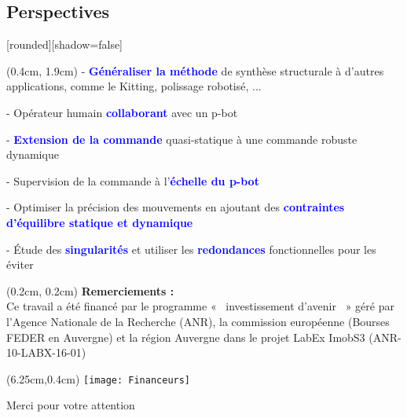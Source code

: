 \documentclass[french]{beamer}
\begin{document}
\subsection{Perspectives}
\begin{frame}
[rounded][shadow=false]
{\normalsize %
\begin{textblock*}{12cm}(0.4cm, 1.9cm)
\vspace{0.25cm}
- \textcolor{blue}{\textbf{Généraliser la méthode}} de synthèse structurale à d'autres applications, comme le Kitting, polissage robotisé, ...

\vspace{0.25cm}
- Opérateur humain \textcolor{blue}{\textbf{collaborant}} avec un p-bot

\vspace{0.25cm}
- \textcolor{blue}{\textbf{Extension de la commande}} quasi-statique à une commande robuste dynamique

\vspace{0.25cm}
- Supervision de la commande à l'\textcolor{blue}{\textbf{échelle du p-bot}}

\vspace{0.25cm}
- Optimiser la précision des mouvements en ajoutant des \textcolor{blue}{\textbf{contraintes d'équilibre statique et dynamique}}

\vspace{0.25cm}
- Étude des \textcolor{blue}{\textbf{singularités}} et utiliser les \textcolor{blue}{\textbf{redondances}} fonctionnelles pour les éviter
\end{textblock*}
}
\end{frame}

{
\begin{frame}
\begin{textblock*}{6cm}(0.2cm, 0.2cm)
\justifying
\tiny{\textbf{Remerciements :}\\
Ce travail a été financé par le programme «  investissement d'avenir  » géré par l'Agence Nationale de la Recherche (ANR), la commission européenne (Bourses FEDER en Auvergne) et la région Auvergne dans le projet LabEx ImobS3 (ANR-10-LABX-16-01)}
\end{textblock*}

\begin{textblock*}{6.25cm}(6.25cm,0.4cm)
\texttt{[image: Financeurs]}
\end{textblock*}
\hspace{0.9cm}\Huge{Merci pour votre attention}
\end{frame}}
\end{document}
